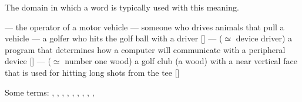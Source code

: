 \documentclass[a4paper,landscape,headrule,footrule,xetex]{foils}
\begin{document}
The domain in which a word is typically used with this meaning.

\begin{exe}
  \ex {} --- the operator of a motor vehicle
  \ex {} --- someone who drives animals that pull a vehicle
  \ex {} --- a golfer who hits the golf ball with a driver [] 
  \ex {} --- ($\simeq$ device driver) a program that determines how a computer will communicate with a peripheral device [] 
  \ex {} --- ($\simeq$ number one wood) a golf club (a wood) with a near vertical face that is used for hitting long shots from the tee [] 
\end{exe}

Some  terms: , , , , , , , , , 
\end{document}
